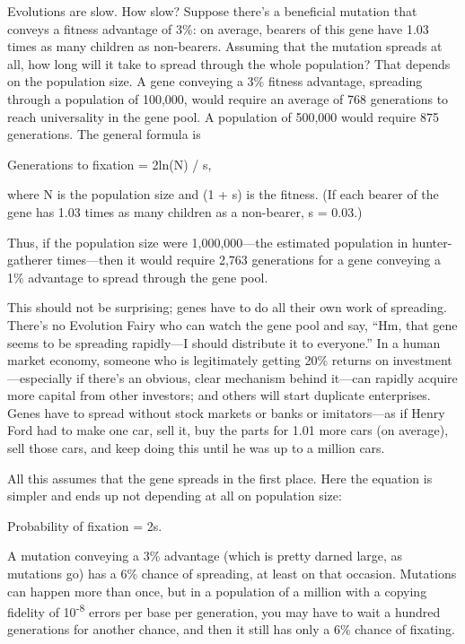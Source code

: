 {
 Evolutions are slow. How slow? Suppose there's a
beneficial mutation that conveys a fitness advantage of 3\%: on
average, bearers of this gene have 1.03 times as many children as
non-bearers. Assuming that the mutation spreads at all, how long will
it take to spread through the whole population? That depends on the
population size. A gene conveying a 3\% fitness advantage, spreading
through a population of 100,000, would require an average of 768
generations to reach universality in the gene pool. A population of
500,000 would require 875 generations. The general formula is}

{\centering
 Generations to fixation = 2ln(N) / s,
\par}


\bigskip

{
 where N is the population size and (1 + s) is the fitness. (If
each bearer of the gene has 1.03 times as many children as a
non-bearer, s = 0.03.) }

{
 Thus, if the population size were 1,000,000---the estimated
population in hunter-gatherer times---then it would require 2,763
generations for a gene conveying a 1\% advantage to spread through the
gene pool.}

{
 This should not be surprising; genes have to do all their own work
of spreading. There's no Evolution Fairy who can watch
the gene pool and say, ``Hm, that gene seems to be
spreading rapidly---I should distribute it to
everyone.'' In a human market economy, someone who is
legitimately getting 20\% returns on investment---especially if
there's an obvious, clear mechanism behind it---can
rapidly acquire more capital from other investors; and others will
start duplicate enterprises. Genes have to spread without stock markets
or banks or imitators---as if Henry Ford had to make one car, sell it,
buy the parts for 1.01 more cars (on average), sell those cars, and
keep doing this until he was up to a million cars.}

{
 All this assumes that the gene spreads in the first place. Here
the equation is simpler and ends up not depending at all on population
size:}

{\centering
 Probability of fixation = 2s.
\par}


\bigskip

{
 A mutation conveying a 3\% advantage (which is pretty darned
large, as mutations go) has a 6\% chance of spreading, at least on that
occasion. Mutations can happen more than once, but
in a population of a million with a copying fidelity of
10\textsuperscript{{}-8} errors per base per generation, you may have
to wait a hundred generations for another chance, and then it still has
only a 6\% chance of fixating. }

